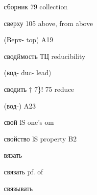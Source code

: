 \begin{minipage}[t]{0.475\textwidth}
\noindent сборник 79 collection\par
\noindent сверху 105 above, from above\par
\noindent (Bepx- top) A19\par
\noindent сводймость ТЦ reducibility\par
\noindent (вод- duc- lead)\par
\noindent сводить $\dagger$ 7\}! 75 reduce\par
\noindent (вод-) A23\par
\noindent свой lS one's om\par
\noindent свойство lS property B2\par
\noindent вязать\par
\noindent связать pf. of\par
\noindent связывать\par
\end{minipage}\hfill
